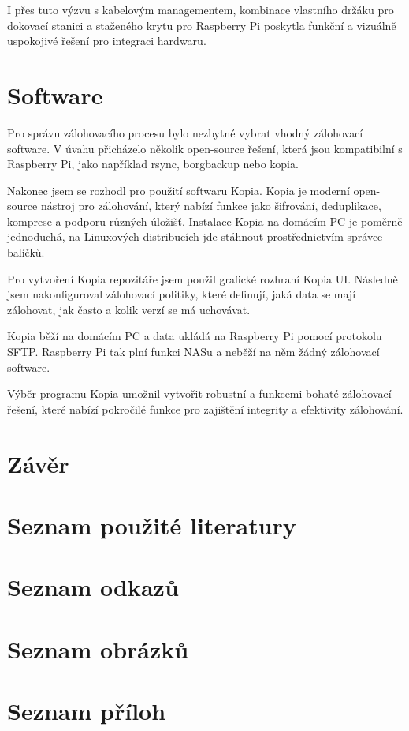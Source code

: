 \documentclass[a4paper,12pt, oneside]{book}
\begin{document}
I přes tuto výzvu s kabelovým managementem, kombinace vlastního
držáku pro dokovací stanici a staženého krytu pro Raspberry Pi poskytla funkční
a vizuálně uspokojivé řešení pro integraci hardwaru.


\chapter{Software}

Pro správu zálohovacího procesu bylo nezbytné vybrat vhodný zálohovací software.
V úvahu přicházelo několik open-source řešení, která jsou kompatibilní s
Raspberry Pi, jako například rsync, borgbackup nebo kopia.

Nakonec jsem se rozhodl pro použití softwaru Kopia. Kopia je moderní open-source
nástroj pro zálohování, který nabízí funkce jako šifrování, deduplikace,
komprese a podporu různých úložišť. Instalace Kopia na domácím PC je poměrně jednoduchá, na Linuxových 
distribucích jde stáhnout prostřednictvím správce balíčků.

Pro vytvoření Kopia repozitáře jsem použil grafické rozhraní Kopia UI.
Následně jsem nakonfiguroval zálohovací politiky, které
definují, jaká data se mají zálohovat, jak často a kolik verzí se má uchovávat.

Kopia běží na domácím PC a data ukládá na Raspberry Pi pomocí protokolu SFTP.
Raspberry Pi tak plní funkci NASu a neběží na něm žádný zálohovací software.

Výběr programu Kopia umožnil vytvořit robustní a funkcemi bohaté zálohovací
řešení, které nabízí pokročilé funkce pro zajištění integrity a efektivity
zálohování.  










\chapter{Závěr}


\chapter{Seznam použité literatury}

\chapter{Seznam odkazů}



\chapter{Seznam obrázků}


\chapter{Seznam příloh}
\end{document}
